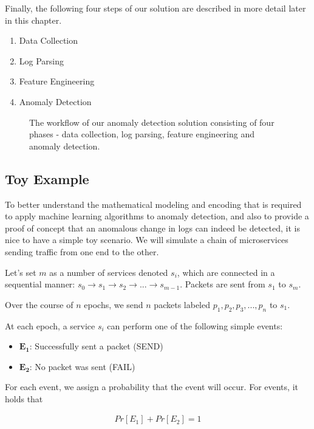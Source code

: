 Finally, the following four steps of our solution are described in more detail later in this chapter.

\begin{enumerate}
    \item Data Collection 
    \item Log Parsing
    \item Feature Engineering
    \item Anomaly Detection
\end{enumerate}

\begin{figure}[h]
    \centering
    
    \caption{The workflow of our anomaly detection solution consisting of four phases - data collection, log parsing, feature engineering and anomaly detection.}
    \label{fig:worklowOverview}
\end{figure}


\subsection{Toy Example}
To better understand the mathematical modeling and encoding that is required to apply machine learning algorithms to anomaly detection, and also to provide a proof of concept that an anomalous change in logs can indeed be detected, it is nice to have a simple toy scenario. We will simulate a chain of microservices sending traffic from one end to the other.

Let's set $m$ as a number of services denoted $s_i$, which are connected in a sequential manner: $s_0 \rightarrow s_1 \rightarrow s_2 \rightarrow ... \rightarrow s_{m-1}$. Packets are sent from $s_1$ to $s_m$.

Over the course of $n$ epochs, we send $n$ packets labeled $p_1, p_2, p_3, ..., p_n$ to $s_1$.

At each epoch, a service $s_i$ can perform one of the following simple events: 

\begin{itemize}
    \item $\mathbf{E_1}$: Successfully sent a packet (SEND)
    \item $\mathbf{E_2}$: No packet was sent (FAIL)
\end{itemize}

For each event, we assign a probability that the event will occur. For events, it holds that 

\begin{gather*}
    Pr[E_1] + Pr[E_2] = 1
\end{gather*}

